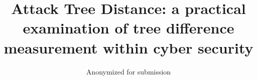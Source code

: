 \documentclass[conference,compsoc]{IEEEtran}
\begin{document}
\title{Attack Tree Distance: a practical examination of tree difference measurement within cyber security}

\iffalse{
    \author{Nathan D. Schiele}
    \orcid{0000-0003-1186-1503}
    \affiliation{\institution{Leiden University}
        \city{Leiden}
        \country{The Netherlands}}
    \email{n.d.schiele@liacs.leidenuniv.nl}


    \author{Olga Gadyatskaya}
    \orcid{0000-0002-3760-9165}
    \affiliation{\institution{Leiden University}
        \city{Leiden}
        \country{The Netherlands}}
    \email{o.gadyatskaya@liacs.leidenuniv.nl}
}\fi
\author{Anonymized for submission}











\maketitle              %

\end{document}
